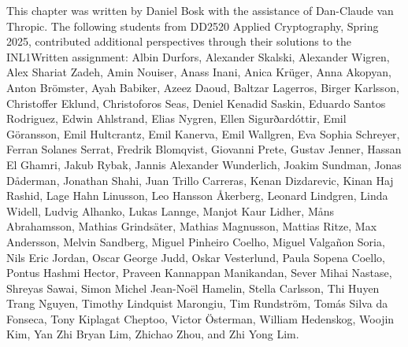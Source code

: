 This chapter was written by Daniel Bosk with the assistance of Dan-Claude van 
Thropic.
The following students from DD2520 Applied Cryptography, Spring 2025, 
contributed additional perspectives through their solutions to the INL1Written 
assignment:
Albin Durfors,
Alexander Skalski,
Alexander Wigren,
Alex Shariat Zadeh,
Amin Nouiser,
Anass Inani,
Anica Krüger,
Anna Akopyan,
Anton Brömster,
Ayah Babiker,
Azeez Daoud,
Baltzar Lagerros,
Birger Karlsson,
Christoffer Eklund,
Christoforos Seas,
Deniel Kenadid Saskin,
Eduardo Santos Rodriguez,
Edwin Ahlstrand,
Elias Nygren,
Ellen Sigurðardóttir,
Emil Göransson,
Emil Hultcrantz,
Emil Kanerva,
Emil Wallgren,
Eva Sophia Schreyer,
Ferran Solanes Serrat,
Fredrik Blomqvist,
Giovanni Prete,
Gustav Jenner,
Hassan El Ghamri,
Jakub Rybak,
Jannis Alexander Wunderlich,
Joakim Sundman,
Jonas Dåderman,
Jonathan Shahi,
Juan Trillo Carreras,
Kenan Dizdarevic,
Kinan Haj Rashid,
Lage Hahn Linusson,
Leo Hansson Åkerberg,
Leonard Lindgren,
Linda Widell,
Ludvig Alhanko,
Lukas Lannge,
Manjot Kaur Lidher,
Måns Abrahamsson,
Mathias Grindsäter,
Mathias Magnusson,
Mattias Ritze,
Max Andersson,
Melvin Sandberg,
Miguel Pinheiro Coelho,
Miguel Valgañon Soria,
Nils Eric Jordan,
Oscar George Judd,
Oskar Vesterlund,
Paula Sopena Coello,
Pontus Hashmi Hector,
Praveen Kannappan Manikandan,
Sever Mihai Nastase,
Shreyas Sawai,
Simon Michel Jean-Noël Hamelin,
Stella Carlsson,
Thi Huyen Trang Nguyen,
Timothy Lindquist Marongiu,
Tim Rundström,
Tomás Silva da Fonseca,
Tony Kiplagat Cheptoo,
Victor Österman,
William Hedenskog,
Woojin Kim,
Yan Zhi Bryan Lim,
Zhichao Zhou,
and
Zhi Yong Lim.